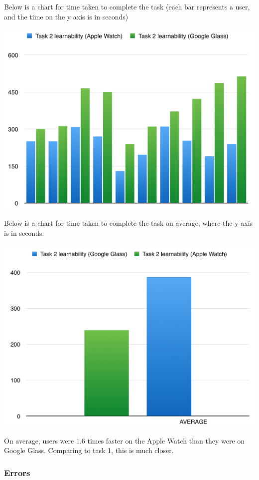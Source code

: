 \documentclass[paper=a4, fontsize=11pt]{scrartcl}	%
\numberwithin{equation}{section}															%
\numberwithin{figure}{section}																%
\numberwithin{table}{section}																%
\begin{document}
Below is a chart for time taken to complete the task (each bar represents a user, and the time on the y axis is in seconds)

\includegraphics[scale=0.8]{task2learnability}


Below is a chart for time taken to complete the task on average, where the y axis is in seconds.

\includegraphics[scale=0.6]{task2learnav}

On average, users were 1.6 times faster on the Apple Watch than they were on Google Glass. Comparing to task 1, this is much closer.

\subsubsection{Errors}
\end{document}
